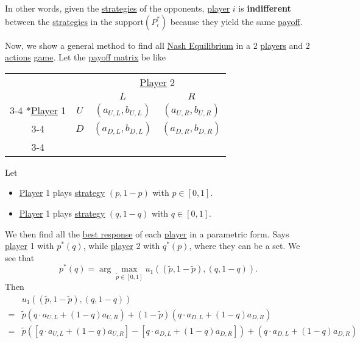 \begin{intuition}
	In other words, given the \hyperref[def:strategy]{strategies} of the opponents, \hyperref[def:player]{player} \(i\) is \textbf{indifferent} between the \hyperref[def:strategy]{strategies} in the \(\mathrm{support}(P_{i}^{\ast}) \) because they yield the same \hyperref[def:reward]{payoff}.
\end{intuition}

Now, we show a general method to find all \hyperref[def:Nash-equilibrium]{Nash Equilibrium} in a \(2\) \hyperref[def:player]{players} and \(2\) \hyperref[def:strategy]{actions} \hyperref[def:game]{game}. Let the \hyperref[def:payoff-matrix]{payoff matrix} be like
\begin{table}[H]
	\centering
	\setlength{\extrarowheight}{2pt}
	\begin{tabular}{cc|c|c|}
		                                               & \multicolumn{1}{c}{} & \multicolumn{2}{c}{\hyperref[def:player]{Player} 2}                           \\
		                                               & \multicolumn{1}{c}{} & \multicolumn{1}{c}{$L$}                             & \multicolumn{1}{c}{$R$} \\\cline{3-4}
		\multirow{2}*{\hyperref[def:player]{Player} 1} & $U$                  & $(a_{U, L}, b_{U, L})$                              & $(a_{U, R}, b_{U, R})$  \\\cline{3-4}
		                                               & $D$                  & $(a_{D, L}, b_{D, L})$                              & $(a_{D, R}, b_{D, R})$  \\\cline{3-4}
	\end{tabular}
\end{table}
Let
\begin{itemize}
	\item \hyperref[def:player]{Player} 1 plays \hyperref[def:strategy]{strategy} \((p, 1 - p)\) with \(p\in \left[0, 1\right]\).
	\item \hyperref[def:player]{Player} 1 plays \hyperref[def:strategy]{strategy} \((q, 1 - q)\) with \(q\in \left[0, 1\right]\).
\end{itemize}
We then find all the \hyperref[def:best-response]{best response} of each \hyperref[def:player]{player} in a parametric form. Says \hyperref[def:player]{player} 1 with \(p^{\ast}(q)\), while \hyperref[def:player]{player} 2 with \(q^{\ast}(p)\), where they can be a set. We see that
\[
	p^{\ast}(q) = \arg\max_{\widetilde{p}\in\left[0, 1\right]}u_1\left((\widetilde{p}, 1 - \widetilde{p}), (q, 1 - q)\right).
\]
Then
\[
	\begin{split}
		&u_1\left((\widetilde{p}, 1 - \widetilde{p}), (q, 1 - q)\right) \\
		= &\widetilde{p}\left(q\cdot a_{U, L} + (1 - q)a_{U, R}\right)+(1 - \widetilde{p})\left(q\cdot a_{D, L}+(1 - q)a_{D, R}\right)\\
		= &\widetilde{p}\left(\left[q\cdot a_{U, L}+(1 - q)a_{U, R}\right] - \left[q\cdot a_{D, L} + (1 - q)a_{D, R}\right]\right)+\left(q\cdot a_{D, L}+(1 - q)a_{D, R}\right)
	\end{split}
\]

